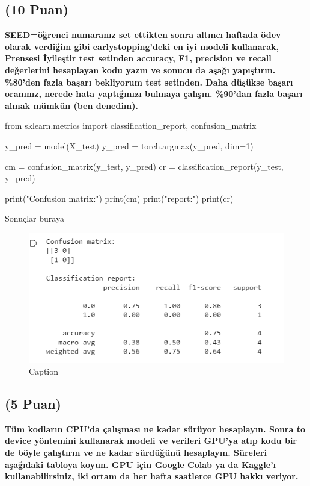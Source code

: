\documentclass[11pt]{article}
\begin{document}
\subsection{(10 Puan)} \textbf{SEED=öğrenci numaranız set ettikten sonra altıncı haftada ödev olarak verdiğim gibi earlystopping'deki en iyi modeli kullanarak, Prensesi İyileştir test setinden accuracy, F1, precision ve recall değerlerini hesaplayan kodu yazın ve sonucu da aşağı yapıştırın. \%80'den fazla başarı bekliyorum test setinden. Daha düşükse başarı oranınız, nerede hata yaptığınızı bulmaya çalışın. \%90'dan fazla başarı almak mümkün (ben denedim).}

\begin{python}
from sklearn.metrics import classification_report, confusion_matrix

y_pred = model(X_test)
y_pred = torch.argmax(y_pred, dim=1)

cm = confusion_matrix(y_test, y_pred)
cr = classification_report(y_test, y_pred)

print("Confusion matrix:")
print(cm)
print("\nClassification report:")
print(cr)
\end{python}

Sonuçlar buraya

\begin{figure}
    \centering
    \includegraphics{test.png}
    \caption{Caption}
    \label{fig:my_label}
\end{figure}

\subsection{(5 Puan)} \textbf{Tüm kodların CPU'da çalışması ne kadar sürüyor hesaplayın. Sonra to device yöntemini kullanarak modeli ve verileri GPU'ya atıp kodu bir de böyle çalıştırın ve ne kadar sürdüğünü hesaplayın. Süreleri aşağıdaki tabloya koyun. GPU için Google Colab ya da Kaggle'ı kullanabilirsiniz, iki ortam da her hafta saatlerce GPU hakkı veriyor.}
\end{document}
